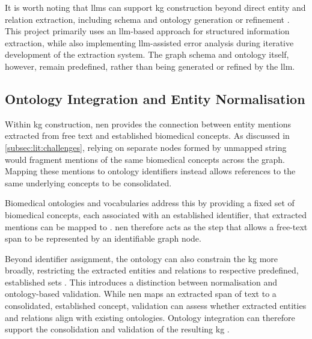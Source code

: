 It is worth noting that \glspl{llm} can support \gls{kg} construction beyond direct entity and relation extraction, including schema and ontology generation or refinement \cite{bian2025_llm_automation_shift} \pref. This project primarily uses an \gls{llm}-based approach for structured information extraction, while also implementing \gls{llm}-assisted error analysis during iterative development of the extraction system. The graph schema and ontology itself, however, remain predefined, rather than being generated or refined by the \gls{llm}.

\subsection{Ontology Integration and Entity Normalisation}
\label{subsec:lit:ontology_integration_and_en}
Within \gls{kg} construction, \gls{nen} provides the connection between entity mentions extracted from free text and established biomedical concepts. As discussed in \ref{subsec:lit:challenges}, relying on separate nodes formed by unmapped string would fragment mentions of the same biomedical concepts across the graph. Mapping these mentions to ontology identifiers instead allows references to the same underlying concepts to be consolidated.

Biomedical ontologies and vocabularies address this by providing a fixed set of biomedical concepts, each associated with an established identifier, that extracted mentions can be mapped to \pref. \gls{nen} therefore acts as the step that allows a free-text span to be represented by an identifiable graph node.

Beyond identifier assignment, the ontology can also constrain the \gls{kg} more broadly, restricting the extracted entities and relations to respective predefined, established sets \pref. This introduces a distinction between normalisation and ontology-based validation. While \gls{nen} maps an extracted span of text to a consolidated, established concept, validation can assess whether extracted entities and relations align with existing ontologies. Ontology integration can therefore support the consolidation and validation of the resulting \gls{kg} \pref.

